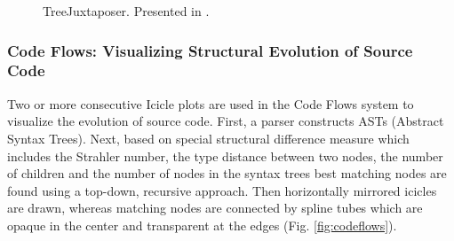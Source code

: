 \begin{figure}[tb]
\caption{\label{fig:treejuxtaposer} TreeJuxtaposer. Presented in \cite{munzner2003treejuxtaposer}.}
\end{figure}

\subsubsection{Code Flows: Visualizing Structural Evolution of Source Code\cite{telea2008code}}
Two or more consecutive Icicle plots are used in the Code Flows system to visualize the evolution of source code. First, a parser constructs ASTs (Abstract Syntax Trees). Next, based on special structural difference measure which includes the Strahler number, the type distance between two nodes, the number of children and the number of nodes in the syntax trees best matching nodes are found using a top-down, recursive approach. Then horizontally mirrored icicles are drawn, whereas matching nodes are connected by spline tubes which are opaque in the center and transparent at the edges (Fig. \ref{fig:codeflows}). 

